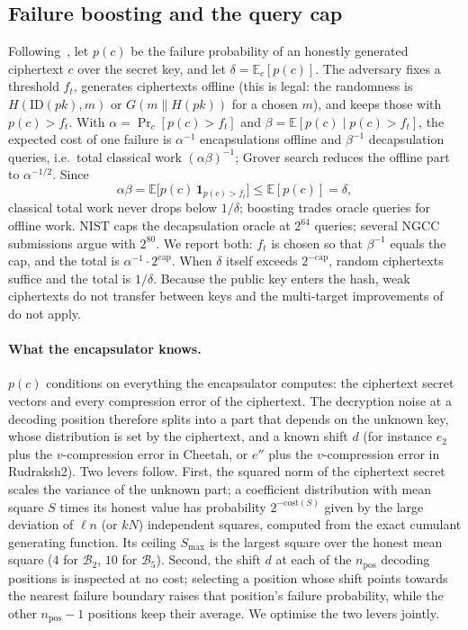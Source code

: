 \documentclass[11pt,a4paper]{article}
\theoremstyle{definition}
\theoremstyle{remark}
\newcommand{\ID}{\mathrm{ID}}
\newcommand{\E}{\mathbb{E}}
\newcommand{\dfr}{\delta}
\newcommand{\CBD}{\mathcal{B}}
\begin{document}
\subsection{Failure boosting and the query cap}
\label{sec:fb}
Following~\cite{DVV19,DB22}, let $p(c)$ be the failure probability of an
honestly generated ciphertext $c$ over the secret key, and let
$\dfr=\E_c[p(c)]$. The adversary fixes a threshold $f_t$, generates
ciphertexts offline (this is legal: the randomness is $H(\ID(pk),m)$ or
$G(m\|H(pk))$ for a chosen $m$), and keeps those with $p(c)>f_t$. With
$\alpha=\Pr_c[p(c)>f_t]$ and $\beta=\E[p(c)\mid p(c)>f_t]$, the expected
cost of one failure is $\alpha^{-1}$ encapsulations offline and
$\beta^{-1}$ decapsulation queries, i.e.\ total classical work
$(\alpha\beta)^{-1}$; Grover search reduces the offline part to
$\alpha^{-1/2}$. Since
\begin{equation}
\label{eq:identity}
\alpha\beta=\E\bigl[p(c)\,\mathbf 1_{p(c)>f_t}\bigr]\le\E[p(c)]=\dfr,
\end{equation}
classical total work never drops below $1/\dfr$; boosting trades oracle
queries for offline work. NIST caps the decapsulation oracle at $2^{64}$
queries; several NGCC submissions argue with $2^{80}$. We report both: $f_t$
is chosen so that $\beta^{-1}$ equals the cap, and the total is
$\alpha^{-1}\cdot 2^{\mathrm{cap}}$. When $\dfr$ itself exceeds $2^{-\mathrm{cap}}$,
random ciphertexts suffice and the total is $1/\dfr$. Because the public
key enters the hash, weak ciphertexts do not transfer between keys and the
multi-target improvements of~\cite{DB22} do not apply.

\paragraph{What the encapsulator knows.}
$p(c)$ conditions on everything the encapsulator computes: the ciphertext
secret vectors and every compression error of the ciphertext. The decryption
noise at a decoding position therefore splits into a part that depends on
the unknown key, whose distribution is set by the ciphertext, and a known
shift $d$ (for instance $e_2$ plus the $v$-compression error in Cheetah, or
$e''$ plus the $v$-compression error in Rudraksh2). Two levers follow.
First, the squared norm of the ciphertext secret scales the variance of the
unknown part; a coefficient distribution with mean square $S$ times its
honest value has probability $2^{-\mathrm{cost}(S)}$ given by the large
deviation of $\ell n$ (or $kN$) independent squares, computed from the exact
cumulant generating function. Its ceiling $S_{\max}$ is the largest square
over the honest mean square ($4$ for $\CBD_2$, $10$ for $\CBD_5$). Second,
the shift $d$ at each of the $n_{\mathrm{pos}}$ decoding positions is
inspected at no cost; selecting a position whose shift points towards the
nearest failure boundary raises that position's failure probability, while
the other $n_{\mathrm{pos}}-1$ positions keep their average. We optimise the
two levers jointly.
\end{document}
